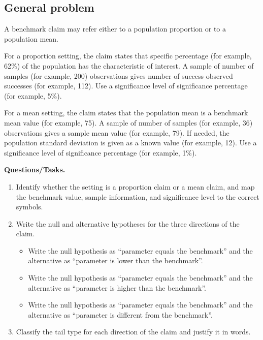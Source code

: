 	\subsection*{General problem}
	A benchmark claim may refer either to a population proportion or to a population mean.
	
	For a proportion setting, the claim states that specific percentage (for example, 62\%) of the population has the characteristic of interest. A sample of number of samples (for example, 200) observations gives number of success observed successes (for example, 112). Use a significance level of significance percentage (for example, 5\%).
	
	For a mean setting, the claim states that the population mean is a benchmark mean value (for example, 75). A sample of number of samples (for example, 36) observations gives a sample mean value (for example, 79). If needed, the population standard deviation is given as a known value (for example, 12). Use a significance level of significance percentage (for example, 1\%).
	
	\textbf{Questions/Tasks.}
	\begin{enumerate}
		\item[(C1)] Identify whether the setting is a proportion claim or a mean claim, and map the benchmark value, sample information, and significance level to the correct symbols.
		\item[(C2)] Write the null and alternative hypotheses for the three directions of the claim.
		\begin{itemize}
			\item[(a)] Write the null hypothesis as ``parameter equals the benchmark'' and the alternative as ``parameter is lower than the benchmark''.
			\item[(b)] Write the null hypothesis as ``parameter equals the benchmark'' and the alternative as ``parameter is higher than the benchmark''.
			\item[(c)] Write the null hypothesis as ``parameter equals the benchmark'' and the alternative as ``parameter is different from the benchmark''.
		\end{itemize}
		\item[(C3)] Classify the tail type for each direction of the claim and justify it in words.
	\end{enumerate}
	

